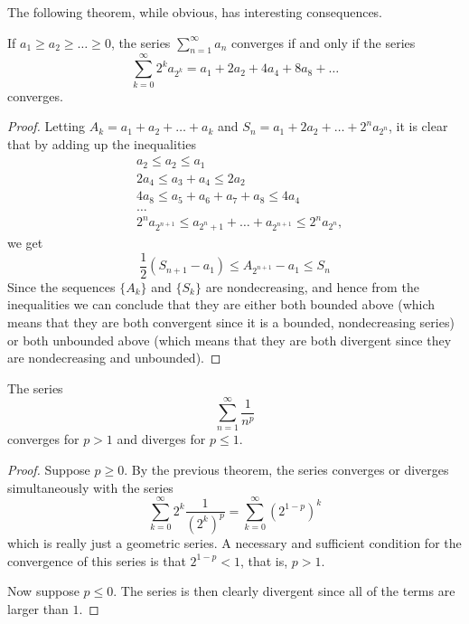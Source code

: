   The following theorem, while obvious, has interesting consequences. 

  \begin{theorem}[Cauchy]
    If $a_1 \geq a_2 \geq \ldots \geq 0$, the series $\sum_{n=1}^\infty a_n$ converges if and only if the series 
    \begin{equation}
      \sum_{k=0}^\infty 2^k a_{2^k} = a_1 + 2 a_2 + 4a_4 + 8a_8 + \ldots 
    \end{equation}
    converges. 
  \end{theorem}
  \begin{proof}
    Letting $A_k = a_1 + a_2 + \ldots + a_k$ and $S_n = a_1 + 2a_2 + \ldots + 2^n a_{2^n}$, it is clear that by adding up the inequalities
    \begin{align*}
      & a_2 \leq a_2 \leq a_1 \\
      & 2a_4 \leq a_3 + a_4 \leq 2a_2 \\
      & 4a_8 \leq a_5 + a_6 + a_7 + a_8 \leq 4a_4 \\
      & \ldots \\
      & 2^n a_{2^{n+1}} \leq a_{2^n + 1} + \ldots + a_{2^{n+1}} \leq 2^n a_{2^n}, 
    \end{align*}
    we get
    \begin{equation}
      \frac{1}{2}(S_{n+1} - a_1) \leq A_{2^{n+1}} - a_1 \leq S_n
    \end{equation}
    Since the sequences $\{A_k\}$ and $\{S_k\}$ are nondecreasing, and hence from the inequalities we can conclude that they are either both bounded above (which means that they are both convergent since it is a bounded, nondecreasing series) or both unbounded above (which means that they are both divergent since they are nondecreasing and unbounded). 
  \end{proof}

  \begin{corollary}
    The series 
    \begin{equation}
      \sum_{n=1}^\infty \frac{1}{n^p}
    \end{equation}
    converges for $p>1$ and diverges for $p \leq 1$. 
  \end{corollary}
  \begin{proof}
    Suppose $p\geq 0$. By the previous theorem, the series converges or diverges simultaneously with the series 
    \begin{equation}
      \sum_{k=0}^\infty 2^k \frac{1}{(2^k)^p} = \sum_{k=0}^\infty (2^{1-p})^k
    \end{equation}
    which is really just a geometric series. A necessary and sufficient condition for the convergence of this series is that $2^{1-p} < 1$, that is, $p>1$. 

    Now suppose $p \leq 0$. The series is then clearly divergent since all of the terms are larger than $1$. 
  \end{proof}

